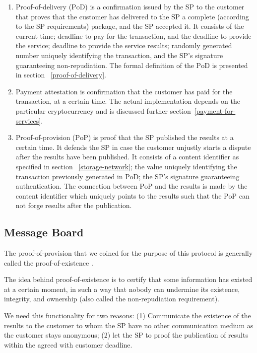\documentclass{ieeeaccess}
\begin{document}
\begin{enumerate}
    \item Proof-of-delivery ($\mathrm{PoD}$) is a confirmation issued by the SP to the customer that proves that the customer has delivered to the SP a complete (according to the SP requirements) package, and the SP accepted it. It consists of the current time; deadline to pay for the transaction, and the deadline to provide the service; deadline to provide the service results; randomly generated number uniquely identifying the transaction, and the SP's signature guaranteeing non-repudiation. The formal definition of the $\mathrm{PoD}$ is presented in section ~\ref{proof-of-delivery}.
    
    \item Payment $\mathrm{attestation}$ is confirmation that the customer has paid for the transaction, at a certain time. The actual implementation depends on the particular cryptocurrency and is discussed further section~\ref{payment-for-services}.
    
    \item Proof-of-provision ($\mathrm{PoP}$) is proof that the SP published the results at a certain time. It defends the SP in case the customer unjustly starts a dispute after the results have been published. It consists of a content identifier as specified in section ~\ref{storage-network}; the value uniquely identifying the transaction previously generated in $\mathrm{PoD}$; the SP's signature guaranteeing authentication. The connection between $\mathrm{PoP}$ and the results is made by the content identifier which uniquely points to the results such that the $\mathrm{PoP}$ can not forge results after the publication.
\end{enumerate}

\subsection{Message Board}\label{message-board}
The proof-of-provision that we coined for the purpose of this protocol
is generally called the proof-of-existence
\cite{proofofexistence, de2016stampery, Chainpoi39}.

The idea behind proof-of-existence is to certify that some information
has existed at a certain moment, in such a way that nobody can
undermine its existence, integrity, and ownership (also called the
non-repudiation requirement).


We need this functionality for two reasons: (1) Communicate the existence
of the results to the customer to whom the SP have no other
communication medium as the customer stays anonymous; (2) let the SP to proof the publication of results within the agreed with customer deadline. 
\end{document}
